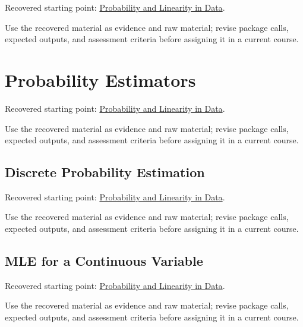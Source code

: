 \documentclass[
  letterpaper,
]{scrbook}
\begin{document}

Recovered starting point:
\hyperref[sec-lab-probability-linearity]{Probability and Linearity in
Data}.

Use the recovered material as evidence and raw material; revise package
calls, expected outputs, and assessment criteria before assigning it in
a current course.

\section*{Probability
Estimators}\label{sec-pr-04-probability-estimators-2}


Recovered starting point:
\hyperref[sec-lab-probability-linearity]{Probability and Linearity in
Data}.

Use the recovered material as evidence and raw material; revise package
calls, expected outputs, and assessment criteria before assigning it in
a current course.

\subsection*{Discrete Probability
Estimation}\label{sec-pr-04-discrete-probability-estimation}

Recovered starting point:
\hyperref[sec-lab-probability-linearity]{Probability and Linearity in
Data}.

Use the recovered material as evidence and raw material; revise package
calls, expected outputs, and assessment criteria before assigning it in
a current course.

\subsection*{MLE for a Continuous
Variable}\label{sec-pr-04-mle-for-a-continuous-variable}

Recovered starting point:
\hyperref[sec-lab-probability-linearity]{Probability and Linearity in
Data}.

Use the recovered material as evidence and raw material; revise package
calls, expected outputs, and assessment criteria before assigning it in
a current course.
\end{document}
